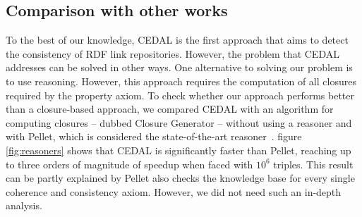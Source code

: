 \subsection{Comparison with other works}
To the best of our knowledge, CEDAL is the first approach that aims to detect the consistency of RDF link repositories. However, the problem that CEDAL addresses can be solved in other ways.
One alternative to solving our problem is to use reasoning. However, this approach requires the computation of all closures required by the property axiom.
To check whether our approach performs better than a closure-based approach, we compared CEDAL with an algorithm for computing closures -- dubbed Closure Generator -- without using a reasoner and with Pellet, which is considered the state-of-the-art reasoner~\cite{bockbenchmarking}. 
figure \ref{fig:reasoners} shows that CEDAL is significantly faster than Pellet, reaching up to three orders of magnitude of speedup when faced with $10^6$ triples.
This result can be partly explained by Pellet also checks the knowledge base for every single coherence and consistency axiom. However, we did not need such an in-depth analysis.

